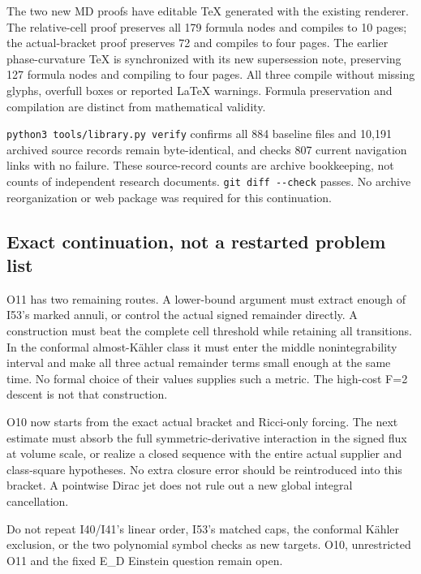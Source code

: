 \documentclass[
  10pt,
]{article}
\begin{document}
The two new MD proofs have editable TeX generated with the existing
renderer. The relative-cell proof preserves all 179 formula nodes and
compiles to 10 pages; the actual-bracket proof preserves 72 and compiles
to four pages. The earlier phase-curvature TeX is synchronized with its
new supersession note, preserving 127 formula nodes and compiling to
four pages. All three compile without missing glyphs, overfull boxes or
reported LaTeX warnings. Formula preservation and compilation are
distinct from mathematical validity.

\texttt{python3\ tools/library.py\ verify} confirms all 884 baseline
files and 10,191 archived source records remain byte-identical, and
checks 807 current navigation links with no failure. These source-record
counts are archive bookkeeping, not counts of independent research
documents. \texttt{git\ diff\ -\/-check} passes. No archive
reorganization or web package was required for this continuation.

\hypertarget{exact-continuation-not-a-restarted-problem-list}{%
\subsection{Exact continuation, not a restarted problem
list}\label{exact-continuation-not-a-restarted-problem-list}}

O11 has two remaining routes. A lower-bound argument must extract enough
of I53's marked annuli, or control the actual signed remainder directly.
A construction must beat the complete cell threshold while retaining all
transitions. In the conformal almost-Kähler class it must enter the
middle nonintegrability interval and make all three actual remainder
terms small enough at the same time. No formal choice of their values
supplies such a metric. The high-cost F=2 descent is not that
construction.

O10 now starts from the exact actual bracket and Ricci-only forcing. The
next estimate must absorb the full symmetric-derivative interaction in
the signed flux at volume scale, or realize a closed sequence with the
entire actual supplier and class-square hypotheses. No extra closure
error should be reintroduced into this bracket. A pointwise Dirac jet
does not rule out a new global integral cancellation.

Do not repeat I40/I41's linear order, I53's matched caps, the conformal
Kähler exclusion, or the two polynomial symbol checks as new targets.
O10, unrestricted O11 and the fixed E\_D Einstein question remain open.
\end{document}
